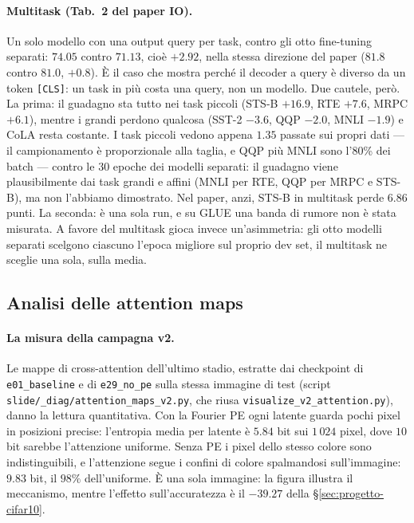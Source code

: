 \documentclass[
  11pt,
]{article}
\begin{document}
\paragraph{Multitask (Tab.~2 del paper IO).} Un solo modello con una output query per task, contro gli otto fine-tuning separati: $74.05$ contro $71.13$, cioè $+2.92$, nella stessa direzione del paper ($81.8$ contro $81.0$, $+0.8$). È il caso che mostra perché il decoder a query è diverso da un token \texttt{[CLS]}: un task in più costa una query, non un modello. Due cautele, però. La prima: il guadagno sta tutto nei task piccoli (STS-B $+16.9$, RTE $+7.6$, MRPC $+6.1$), mentre i grandi perdono qualcosa (SST-2 $-3.6$, QQP $-2.0$, MNLI $-1.9$) e CoLA resta costante. I task piccoli vedono appena $1.35$ passate sui propri dati --- il campionamento è proporzionale alla taglia, e QQP più MNLI sono l'80\% dei batch --- contro le 30 epoche dei modelli separati: il guadagno viene plausibilmente dai task grandi e affini (MNLI per RTE, QQP per MRPC e STS-B), ma non l'abbiamo dimostrato. Nel paper, anzi, STS-B in multitask perde $6.86$ punti. La seconda: è una sola run, e su GLUE una banda di rumore non è stata misurata. A favore del multitask gioca invece un'asimmetria: gli otto modelli separati scelgono ciascuno l'epoca migliore sul proprio dev set, il multitask ne sceglie una sola, sulla media.

\subsection{Analisi delle attention maps}
\label{sec:progetto-attention}

\paragraph{La misura della campagna v2.} Le mappe di cross-attention dell'ultimo stadio, estratte dai checkpoint di \texttt{e01\_baseline} e di \texttt{e29\_no\_pe} sulla stessa immagine di test (script \texttt{slide/\_diag/attention\_maps\_v2.py}, che riusa \texttt{visualize\_v2\_attention.py}), danno la lettura quantitativa. Con la Fourier PE ogni latente guarda pochi pixel in posizioni precise: l'entropia media per latente è $5.84$ bit sui $1\,024$ pixel, dove $10$ bit sarebbe l'attenzione uniforme. Senza PE i pixel dello stesso colore sono indistinguibili, e l'attenzione segue i confini di colore spalmandosi sull'immagine: $9.83$ bit, il $98\%$ dell'uniforme. È una sola immagine: la figura illustra il meccanismo, mentre l'effetto sull'accuratezza è il $-39.27$ della §\ref{sec:progetto-cifar10}.
\end{document}
